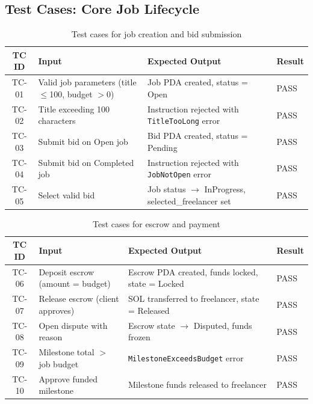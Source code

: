 \subsection{Test Cases: Core Job Lifecycle}

\begin{table}[H]
\centering
\caption{Test cases for job creation and bid submission}
\label{table:tc_job}
\begin{tabular}{|c|p{4cm}|p{4cm}|p{3cm}|}
\hline
\textbf{TC ID} & \textbf{Input} & \textbf{Expected Output} & \textbf{Result} \\ \hline
TC-01 & Valid job parameters (title $\leq$100, budget $>$0) & Job PDA created, status = Open & PASS \\ \hline
TC-02 & Title exceeding 100 characters & Instruction rejected with \texttt{TitleTooLong} error & PASS \\ \hline
TC-03 & Submit bid on Open job & Bid PDA created, status = Pending & PASS \\ \hline
TC-04 & Submit bid on Completed job & Instruction rejected with \texttt{JobNotOpen} error & PASS \\ \hline
TC-05 & Select valid bid & Job status $\to$ InProgress, selected\_freelancer set & PASS \\ \hline
\end{tabular}
\end{table}

\begin{table}[H]
\centering
\caption{Test cases for escrow and payment}
\label{table:tc_escrow}
\begin{tabular}{|c|p{4cm}|p{4cm}|p{3cm}|}
\hline
\textbf{TC ID} & \textbf{Input} & \textbf{Expected Output} & \textbf{Result} \\ \hline
TC-06 & Deposit escrow (amount = budget) & Escrow PDA created, funds locked, state = Locked & PASS \\ \hline
TC-07 & Release escrow (client approves) & SOL transferred to freelancer, state = Released & PASS \\ \hline
TC-08 & Open dispute with reason & Escrow state $\to$ Disputed, funds frozen & PASS \\ \hline
TC-09 & Milestone total $>$ job budget & \texttt{MilestoneExceedsBudget} error & PASS \\ \hline
TC-10 & Approve funded milestone & Milestone funds released to freelancer & PASS \\ \hline
\end{tabular}
\end{table}

